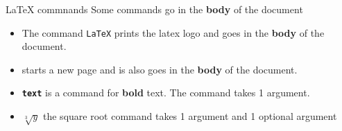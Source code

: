 \begin{frame}[fragile]{LaTeX commnands}
    Some commands go in the \textbf{body} of the document
    \newline
    \begin{itemize}
    \item The command \texttt{\LaTeX} prints the latex logo and goes in the \textbf{body} of the document. \newline

    \item \texttt{\newpage} starts a new page and is also goes in the \textbf{body} of the document.
    \newline

    \item \texttt{\textbf{text}} is a command for \textbf{bold} text. The command takes 1 argument.
    \newline
    \item \texttt{}  \(\sqrt[3]{y}\) the square root command takes 1 argument and 1 optional argument
    \end{itemize}
\end{frame}